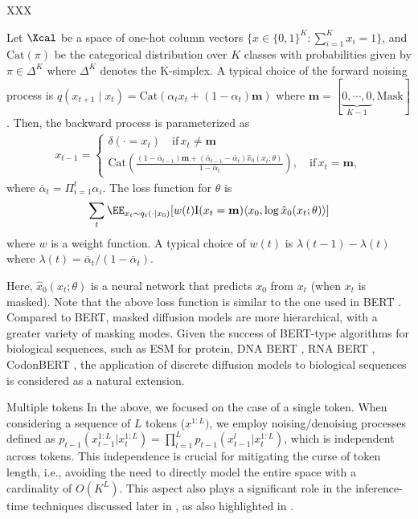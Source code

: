 \documentclass[12pt]{article} %
\begin{document}
{\begin{Exabox}{XXX}
\begin{example}
Let $\Xcal$ be a space of one-hot column vectors $\{x\in\{0,1\}^K:\sum_{i=1}^K x_i =1\}$, and $\mathrm{Cat}(\pi)$ be the categorical distribution over $K$ classes with probabilities given by $\pi \in \Delta^K$ where $\Delta^K$ denotes the K-simplex. A typical choice of the forward noising process is  
$q(x_{t+1}\mid x_{t}) = \mathrm{Cat}(\alpha_t x_{t}+ (1- \alpha_t)\mathbf{m} )$
where $\mathbf{m}=[\underbrace{0,\cdots,0}_{K-1},\mathrm{Mask}]$. Then, the backward process is parameterized as
\begin{align*}
x_{t-1}=
   \begin{cases}  
     \delta(\cdot = x_t) \quad \mathrm{if}\, x_t\neq \mathbf{m}  \\
       \mathrm{Cat}\left ( \frac{(1-\bar \alpha_{t-1})\mathbf{m}  + (\bar \alpha_{t-1}- \bar \alpha_t) \hat x_0(x_t;\theta) }{ 1 - \bar \alpha_t } \right),\quad \mathrm{if}\,x_t= \mathbf{m}, 
   \end{cases}  
\end{align*}
where $\bar{\alpha}_t = \Pi_{i=1}^t \alpha_i$. The loss function for $\theta$ is 
\begin{align}\label{eq:loss_discrete}
    \sum_t \EE_{x_t \sim q_t(\cdot|x_0)}[w(t)\mathrm{I}(x_t=\mathbf{m})\langle x_0, \log \hat x_0(x_t;\theta)\rangle  ] 
\end{align}
where $w$ is a weight function. A typical choice of $w(t)$ is $\lambda(t-1)-\lambda(t)$ where $\lambda(t)=\bar \alpha_{t}/(1-\bar \alpha_t)$. 


Here, $\hat{x}_0(x_t; \theta)$ is a neural network that predicts $x_0$ from $x_t$ (when $x_t$ is masked). Note that the above loss function is similar to the one used in BERT \citep{devlin2018bert}. Compared to BERT, masked diffusion models are more hierarchical, with a greater variety of masking modes. Given the success of BERT-type algorithms for biological sequences, such as ESM \citep{hayes2024simulating} for protein, DNA BERT \citep{ji2021dnabert}, RNA BERT \citep{akiyama2022informative}, CodonBERT \citep{ren2024codonbert}, the application of discrete diffusion models to biological sequences is considered as a natural extension.

\end{example}
\end{Exabox}

\begin{remark}{Multiple tokens} In the above, we focused on the case of a single token. When considering a sequence of $L$ tokens ($x^{1:L})$, we employ noising/denoising processes defined as $p_{t-1}(x^{1:L}_{t-1} |x^{1:L}_{t}) = \prod_{l=1}^L p_{t-1}(x^l_{t-1}|x^{1:L}_{t})$, which is  independent across tokens. This independence is crucial for mitigating the curse of token length, i.e., avoiding the need to directly model the entire space with a cardinality of $O(K^L)$. This aspect also plays a significant role in the inference-time techniques discussed later in , as also highlighted in \citet{nisonoff2024unlocking}. 
\end{remark}

}
\end{document}
